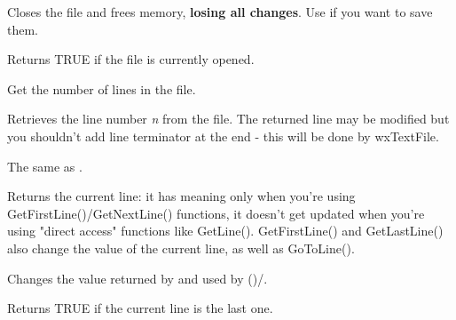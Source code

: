 
Closes the file and frees memory, {\bf losing all changes}. Use  
if you want to save them.

\label{wxtextfileisopened}


Returns TRUE if the file is currently opened.

\label{wxtextfilegetlinecount}


Get the number of lines in the file.

\label{wxtextfilegetline}


Retrieves the line number {\it n} from the file. The returned line may be
modified but you shouldn't add line terminator at the end - this will be done
by wxTextFile.

\label{wxtextfileoperatorarray}


The same as .

\label{wxtextfilegetcurrentline}


Returns the current line: it has meaning only when you're using
GetFirstLine()/GetNextLine() functions, it doesn't get updated when
you're using "direct access" functions like GetLine(). GetFirstLine() and
GetLastLine() also change the value of the current line, as well as
GoToLine().

\label{wxtextfilegotoline}


Changes the value returned by  
and used by ()/.

\label{wxtextfileeof}


Returns TRUE if the current line is the last one.

